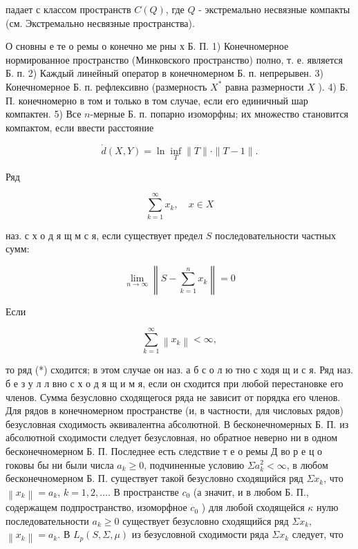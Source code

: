 \documentclass[10pt]{article}
\begin{document}
падает с классом пространств $C(Q)$, где $Q$ - экстремально несвязные компакты (см. Экстремально несвязные пространства).



О сновны е те о ремы о конечно ме рны х Б. П. 1) Конечномерное нормированное пространство (Минковского пространство) полно, т. е. является Б. п. 2) Каждый линейный оператор в конечномерном Б. п. непрерывен. 3) Конечномерное Б. п. рефлексивно (размерность $X^{*}$ равна размерности $X$ ). 4) Б. П. конечномерно в том и только в том случае, если его единичный шар компактен. 5) Все $n$-мерные Б. п. попарно изоморфны; их множество становится компактом, если ввести расстояние



\[

\dot{d}(X, Y)=\ln \inf _{T}\|T\| \cdot\|T-1\| .

\]



Ряд



\[

\sum_{k=1}^{\infty} x_{k}, \quad x \in X

\]



наз. с х о д я щ м с я, если существует предел $S$ последовательности частных сумм:



\[

\lim _{n \rightarrow \infty}\left\|S-\sum_{k=1}^{n} x_{k}\right\|=0

\]



Если



\[

\sum_{k=1}^{\infty}\left\|x_{k}\right\|<\infty,

\]



то ряд (*) сходится; в этом случае он наз. а б с о л ю тно с ходя щ и с я. Ряд наз. б е з у л л вно с х о д я щ и м я, если он сходится при любой перестановке его членов. Сумма безусловно сходящегося ряда не зависит от порядка его членов. Для рядов в конечномерном пространстве (и, в частности, для числовых рядов) безусловная сходимость әквивалентна абсолютной. В бесконечномерных Б. П. из абсолютной сходимости следует безусловная, но обратное неверно ни в одном бесконечномерном Б. П. Последнее есть следствие т е о ремы Д во р е ц о гоковы бы ни были числа $a_{k} \geqslant 0$, подчиненные условию $\Sigma a_{k}^{2}<\infty$, в любом бесконечномерном Б. П. существует такой безусловно сходящийся ряд $\Sigma x_{k}$, что $\left\|x_{k}\right\|=a_{k}$, $k=1,2, \ldots$. В пространстве $c_{0}$ (а значит, и в любом Б. П., содержащем подпространство, изоморфное $c_{0}$ ) для любой сходящейся $\kappa$ нулю последовательности $a_{k} \geqslant 0$ существует безусловно сходящийся ряд $\Sigma x_{k}$, $\left\|x_{k}\right\|=a_{k}$. В $L_{p}(S, \Sigma, \mu)$ из безусловной сходимости ряда $\Sigma x_{k}$ следует, что
\end{document}
